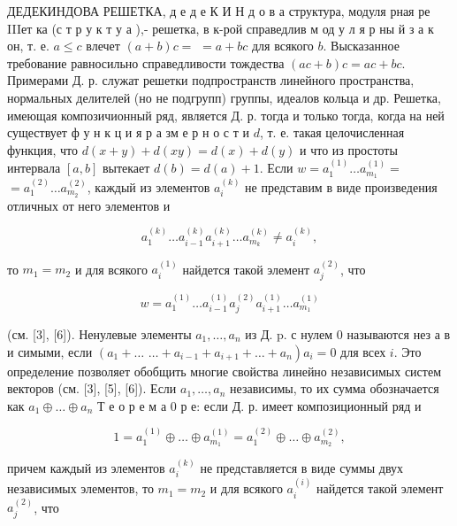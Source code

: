 \documentclass[10pt]{article}
\begin{document}
ДЕДЕКИНДОВА РЕШЕТКА, д $е$ д $е$ К И Н д о в а структура, модуля рная ре IIIет ка (с т р у к т у а ),- решетка, в к-рой справедлив м од у л я р ны й з а к он, т. е. $a \leqslant c$ влечет $(a+b) c=$ $=a+b c$ для всякого $b$. Высказанное требование равносильно справедливости тождества $(a c+b) c=a c+b c$. Примерами Д. р. служат решетки подпространств линейного пространства, нормальных делителей (но не подгрупп) группы, идеалов кольца и др. Решетка, имеющая композичионный ряд, является Д. р. тогда и только тогда, когда на ней существует ф у н к ц и я р а зм е р н о с т и $d$, т. е. такая целочисленная функция, что $d(x+y)+d(x y)=d(x)+d(y)$ и что из простоты интервала $[a, b]$ вытекает $d(b)=d(a)+1$. Если $w=a_{1}^{(1)} \ldots a_{m_{1}}^{(1)}=$ $=a_{1}^{(2)} \ldots a_{m_{2}}^{(2)}$, каждый из элементов $a_{i}^{(k)}$ не представим в виде произведения отличных от него элементов и



\[

a_{1}^{(k)} \ldots a_{i-1}^{(k)} a_{i+1}^{(k)} \ldots a_{m_{k}}^{(k)} \neq a_{i}^{(k)},

\]



то $m_{1}=m_{2}$ и для всякого $a_{i}^{(1)}$ найдется такой элемент $a_{j}^{(2)}$, что



\[

w=a_{1}^{(1)} \ldots a_{i-1}^{(1)} a_{j}^{(2)} a_{i+1}^{(1)} \ldots a_{m_{1}}^{(1)}

\]



(см. [3], [6]). Ненулевые элементы $a_{1}, \ldots, a_{n}$ из Д. p. с нулем 0 называются нез а в и симыми, если $\left(a_{1}+\ldots\right.$ $\left.\ldots+a_{i-1}+a_{i+1}+\ldots+a_{n}\right) a_{i}=0$ для всех $i$. Это определение позволяет обобщить многие свойства линейно независимых систем векторов (см. [3], [5], [6]). Если $a_{1}, \ldots, a_{n}$ независимы, то их сумма обозначается как $a_{1} \oplus \ldots \oplus a_{n}$ Т е о р е м а 0 р е: если Д. р. имеет композиционный ряд и



\[

1=a_{1}^{(1)} \oplus \ldots \oplus a_{m_{1}}^{(1)}=a_{1}^{(2)} \oplus \ldots \oplus a_{m_{2}}^{(2)},

\]



причем каждый из элементов $a_{i}^{(k)}$ не представляется в виде суммы двух независимых элементов, то $m_{1}=m_{2}$ и для всякого $a_{i}^{(i)}$ найдется такой элемент $a_{j}^{(2)}$, что
\end{document}
